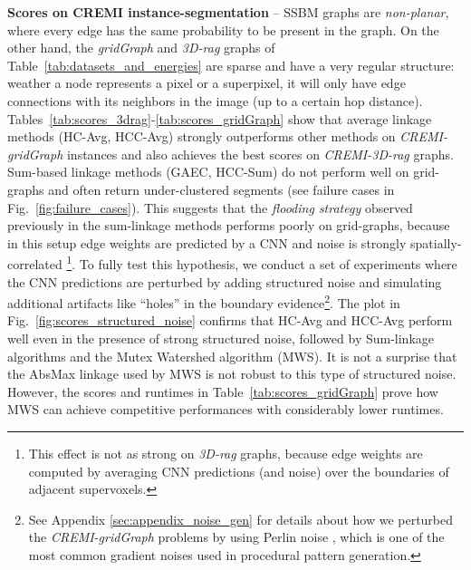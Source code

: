 \textbf{Scores on CREMI instance-segmentation} -- 
SSBM graphs are \emph{non-planar}, where every edge has the same probability to be present in the graph. On the other hand, the \emph{gridGraph} and \emph{3D-rag} graphs of Table~\ref{tab:datasets_and_energies} are sparse and have a very regular structure: weather a node represents a pixel or a superpixel, it will only have edge connections with its neighbors in the image (up to a certain hop distance). 
Tables~\ref{tab:scores_3drag}-\ref{tab:scores_gridGraph} show that average linkage methods (HC-Avg, HCC-Avg) strongly outperforms other methods on \emph{CREMI-gridGraph} instances and also achieves the best scores on \emph{CREMI-3D-rag} graphs. Sum-based linkage methods (GAEC, HCC-Sum) do not perform well on grid-graphs and often return under-clustered segments (see failure cases in Fig.~\ref{fig:failure_cases}). This suggests that the \emph{flooding strategy} observed previously in the sum-linkage methods performs poorly on grid-graphs, because in this setup edge weights are predicted by a CNN and noise is strongly spatially-correlated \footnote{This effect is not as strong on \emph{3D-rag} graphs, because edge weights are computed by averaging CNN predictions (and noise) over the boundaries of adjacent supervoxels.}.
To fully test this hypothesis, we conduct a set of experiments where the CNN predictions are perturbed by adding structured noise and simulating additional artifacts like ``holes'' in the boundary evidence\footnote{See Appendix \ref{sec:appendix_noise_gen} for details about how we perturbed the \emph{CREMI-gridGraph} problems by using Perlin noise \cite{perlin2001noise,perlin1985image}, which is one of the most common gradient noises used in procedural pattern generation.}. 
The plot in Fig.~\ref{fig:scores_structured_noise} confirms that HC-Avg and HCC-Avg perform well even in the presence of strong structured noise, followed by Sum-linkage algorithms and the Mutex Watershed algorithm (MWS). It is not a surprise that the AbsMax linkage used by MWS is not robust to this type of structured noise. However, the scores and runtimes in Table~\ref{tab:scores_gridGraph} prove how MWS can achieve competitive performances with considerably lower runtimes. 

